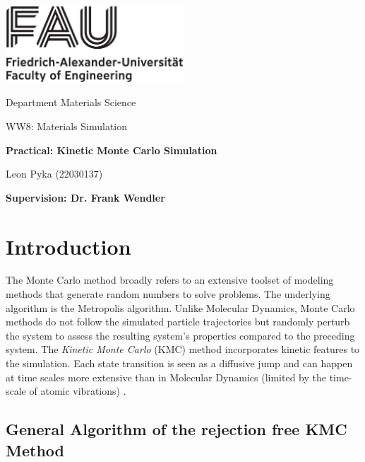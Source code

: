 




%
\begin{titlepage}
\begin{center}
\includegraphics[width=0.5\textwidth]{graphics/FAU_TechFak_EN_H_black.eps}

\LARGE Department Materials Science

\Large WW8: Materials Simulation

\LARGE \textbf{Practical: Kinetic Monte Carlo Simulation}



\vfil
\Large Leon Pyka (22030137)



\Large \textbf{Supervision: Dr. Frank Wendler}
\end{center}

\thispagestyle{empty}
%
\end{titlepage}
%

\setcounter{page}{1}
\tableofcontents
\newpage

\section{Introduction}
The Monte Carlo method broadly refers to an extensive toolset of modeling methods that generate random numbers to solve problems. The underlying algorithm is the Metropolis algorithm. Unlike Molecular Dynamics, Monte Carlo methods do not follow the simulated particle trajectories but randomly perturb the system to assess the resulting system's properties compared to the preceding system. The  \textit{Kinetic Monte Carlo} (KMC) method incorporates kinetic features to the simulation. Each state transition is seen as a diffusive jump and can happen at time scales more extensive than in Molecular Dynamics (limited by the time-scale of atomic vibrations) \cite{voter2007}. 


\subsection{General Algorithm of the rejection free KMC Method}\label{sec:general_kmc_algorithm}

